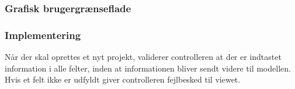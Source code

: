 \subsubsection{Grafisk brugergrænseflade}

\subsubsection{Implementering}
Når der skal oprettes et nyt projekt, validerer controlleren at der er indtastet information i alle felter,
inden at informationen bliver sendt videre til modellen. Hvis et felt ikke er udfyldt giver controlleren fejlbesked til viewet. \\

\clearpage